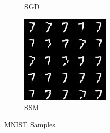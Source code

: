 \begin{figure}[H]
\begin{subfigure}[b]{0.3\textwidth}
        \caption{SGD}
        \label{fig:sub2}
    \end{subfigure}
    \hfill
    \begin{subfigure}[b]{0.3\textwidth}
        \centering
        \includegraphics[width=\textwidth]{figures/mnist_SSM.png} %
        \caption{SSM}
        \label{fig:sub3}
    \end{subfigure}

    \caption{MNIST Samples}
    \label{fig:three_images}
\end{figure}